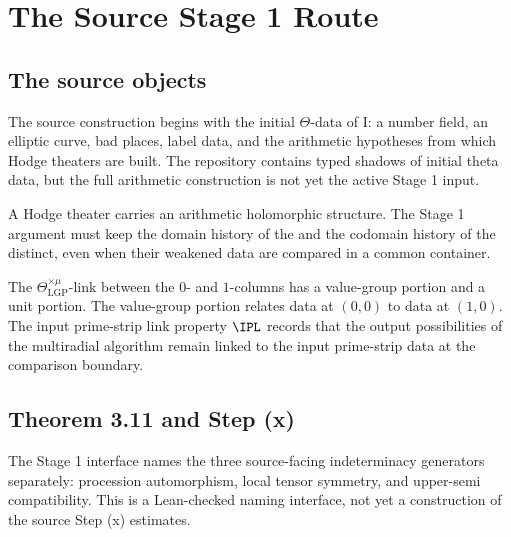 \chapter{The Source Stage 1 Route}
\label{ch:stage1-source}

\section{The source objects}

\begin{definition}
  \label{def:initial-theta-data}
  \notready
  The source construction begins with the initial \(\Theta\)-data of \IUT{} I:
  a number field, an elliptic curve, bad places, label data, and the
  arithmetic hypotheses from which Hodge theaters are built.  The repository
  contains typed shadows of initial theta data, but the full arithmetic
  construction is not yet the active Stage 1 input.
\end{definition}

\begin{definition}
  \label{def:hodge-theater-histories}
  \notready
  A Hodge theater carries an arithmetic holomorphic structure.  The Stage 1
  argument must keep the domain history of the \ThetaPilot{} and the codomain
  history of the \qPilot{} distinct, even when their weakened data are compared
  in a common container.
\end{definition}

\begin{definition}
  \label{def:prime-strip-links}
  \notready
  The \(\Theta^{\times\mu}_{\mathrm{LGP}}\)-link between the \(0\)- and
  \(1\)-columns has a value-group portion and a unit portion.  The value-group
  portion relates \ThetaPilot{} data at \((0,0)\) to \qPilot{} data at
  \((1,0)\).  The input prime-strip link property \(\IPL\) records that the
  output possibilities of the multiradial algorithm remain linked to the input
  prime-strip data at the comparison boundary.
\end{definition}

\section{Theorem 3.11 and Step (x)}

\begin{definition}
  \label{def:indeterminacy-generator-interface}
  \leanok
  The Stage 1 interface names the three source-facing indeterminacy
  generators separately: procession automorphism, local tensor symmetry, and
  upper-semi compatibility.  This is a Lean-checked naming interface, not yet
  a construction of the source Step (x) estimates.
\end{definition}

